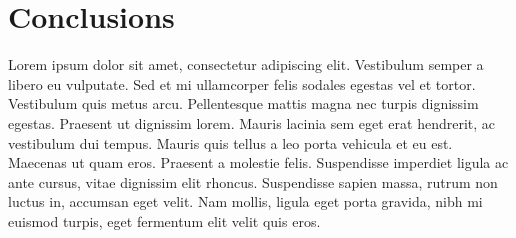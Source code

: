 \documentclass{acm_proc_article-sp}
\begin{document}
\section{Conclusions}

Lorem ipsum dolor sit amet, consectetur adipiscing elit. Vestibulum semper a libero eu vulputate. Sed et mi ullamcorper felis sodales egestas vel et tortor. Vestibulum quis metus arcu. Pellentesque mattis magna nec turpis dignissim egestas. Praesent ut dignissim lorem. Mauris lacinia sem eget erat hendrerit, ac vestibulum dui tempus. Mauris quis tellus a leo porta vehicula et eu est. Maecenas ut quam eros. Praesent a molestie felis. Suspendisse imperdiet ligula ac ante cursus, vitae dignissim elit rhoncus. Suspendisse sapien massa, rutrum non luctus in, accumsan eget velit. Nam mollis, ligula eget porta gravida, nibh mi euismod turpis, eget fermentum elit velit quis eros.




\end{document}
